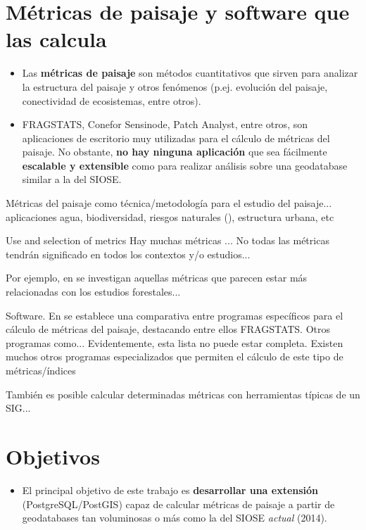 \section{Métricas de paisaje y software que las calcula}

\begin{graybox}
\begin{itemize}
\item Las \textbf{métricas de paisaje} son métodos cuantitativos que sirven para analizar la estructura del paisaje y otros fenómenos (p.ej. evolución del paisaje, conectividad de ecosistemas, entre otros).
\item FRAGSTATS, Conefor Sensinode, Patch Analyst, entre otros, son aplicaciones de escritorio muy utilizadas para el cálculo de métricas del paisaje. No obstante, \textbf{no hay ninguna aplicación} que sea fácilmente \textbf{escalable y extensible} como para realizar análisis sobre una geodatabase similar a la del SIOSE.
\end{itemize}
\end{graybox}

Métricas del paisaje como técnica/metodología para el estudio del paisaje... aplicaciones agua, biodiversidad, riesgos naturales (), estructura urbana,  etc  

Use and selection of metrics
Hay muchas métricas ...
No todas las métricas tendrán significado en todos los contextos y/o estudios... \cite{Uuemaa2009} 

Por ejemplo, en \cite{Uuemaa2017} se investigan aquellas métricas que parecen estar más relacionadas con los estudios forestales...

Software.  En \cite{Zaragozi2012} se establece una comparativa entre programas específicos para el cálculo de métricas del paisaje, destacando entre ellos FRAGSTATS. Otros programas como... Evidentemente, esta lista no puede estar completa. Existen muchos otros programas especializados que permiten el cálculo de este tipo de métricas/índices

También es posible calcular determinadas métricas con herramientas típicas de un SIG...




\section{Objetivos}


\begin{itemize}
\item El principal objetivo de este trabajo es \textbf{desarrollar una extensión} (PostgreSQL/PostGIS) capaz de calcular métricas de paisaje a partir de geodatabases tan voluminosas o más como la del SIOSE \textit{actual} (2014).
\end{itemize}


